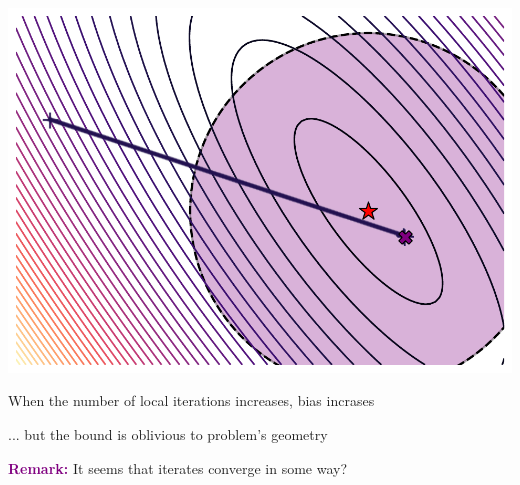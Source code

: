 \documentclass[aspectratio=169,12pt]{beamer}
\begin{document}
\begin{frame}[t]
\begin{center}
{  \includegraphics[width=0.3\linewidth]{images/plots/fedavg_True_50_t1000_s0.pdf}
}%

  \end{center}

  \begin{center}
    When the number of local iterations increases, bias incrases

    \pause
    
    ... but the bound is oblivious to problem's geometry
    

  \pause
  
  \textcolor{purple}{\bfseries Remark:} It seems that iterates converge in some way?
  \end{center}
  
\end{frame}
\end{document}
